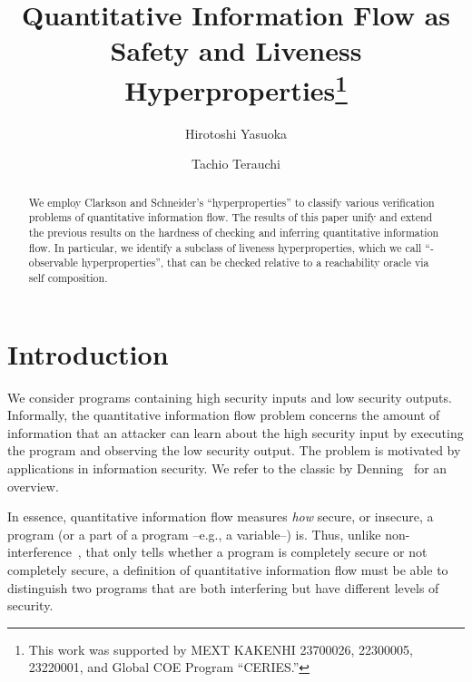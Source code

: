 \documentclass[]{eptcs}
\begin{document}
\title{Quantitative Information Flow as Safety and Liveness
  Hyperproperties\thanks{This work was supported by MEXT KAKENHI
    23700026, 22300005, 23220001, and Global COE Program ``CERIES.''}}


\author{Hirotoshi Yasuoka
\and
Tachio Terauchi
}


\def\titlerunning{Quantitative Information Flow as Safety and Liveness
  Hyperproperties}
\def\authorrunning{H. Yasuoka \& T. Terauchi}
\maketitle

\begin{abstract}
  We employ Clarkson and Schneider's ``hyperproperties'' to classify
  various verification problems of quantitative information flow.  The
  results of this paper unify and extend the previous results on the
  hardness of checking and inferring quantitative information flow.
  In particular, we identify a subclass of liveness hyperproperties,
  which we call ``-observable hyperproperties'', that can be
  checked relative to a reachability oracle via self composition.
\end{abstract}

\section{Introduction}
\label{sec:introduction}

We consider programs containing high security inputs and low security
outputs.  Informally, the quantitative information flow problem
concerns the amount of information that an attacker can learn about
the high security input by executing the program and observing the low
security output.  The problem is motivated by applications in
information security.  We refer to the classic by
Denning~\cite{denning82} for an overview.

In essence, quantitative information flow measures {\em how} secure,
or insecure, a program (or a part of a program --e.g., a variable--)
is.  Thus, unlike
non-interference~\cite{DBLP:conf/sosp/Cohen77,goguen:sp1982}, that
only tells whether a program is completely secure or not completely
secure, a definition of quantitative information flow must be able to
distinguish two programs that are both interfering but have different
levels of security.
\end{document}
